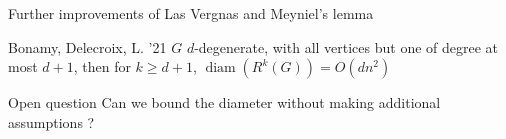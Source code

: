\documentclass[11pt,xcolor=dvipsnames,presentation]{beamer}
\newcommand{\backupbegin}{
   \newcounter{finalframe}
   \setcounter{finalframe}{\value{framenumber}}
}
\newcommand{\backupend}{
   \setcounter{framenumber}{\value{finalframe}}
}
\DeclareMathOperator{\diam}{diam}
\begin{document}
\begin{frame}{Further improvements of Las Vergnas and Meyniel's lemma}
  \begin{block}{Bonamy, Delecroix, L. '21}
    $G$ $d$-degenerate, with all vertices
    but one of degree at most $d+1$, then for $k \ge d+1$, $\diam(R^k(G)) = O(dn^2)$
  \end{block}

  \begin{alertblock}{Open question}
    Can we bound the diameter without making additional assumptions ?
  \end{alertblock}
\end{frame}

\end{document}
